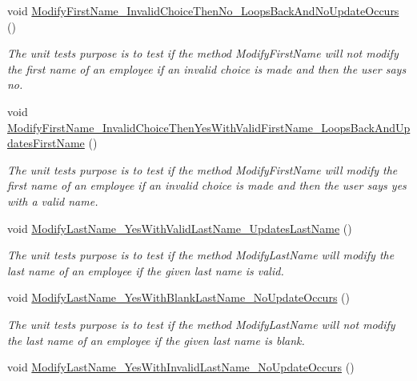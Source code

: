 \begin{DoxyCompactItemize}
void \hyperlink{class_the_company_1_1_tests_1_1_modify_employee_tests_a727562d5a016f961b0f441e896a9de1a}{Modify\+First\+Name\+\_\+\+Invalid\+Choice\+Then\+No\+\_\+\+Loops\+Back\+And\+No\+Update\+Occurs} ()
\begin{DoxyCompactList}\small\item\em The unit test\textquotesingle{}s purpose is to test if the method Modify\+First\+Name will not modify the first name of an employee if an invalid choice is made and then the user says no. \end{DoxyCompactList}\item 
void \hyperlink{class_the_company_1_1_tests_1_1_modify_employee_tests_ab634694a28fefe065d015224b953fa4b}{Modify\+First\+Name\+\_\+\+Invalid\+Choice\+Then\+Yes\+With\+Valid\+First\+Name\+\_\+\+Loops\+Back\+And\+Updates\+First\+Name} ()
\begin{DoxyCompactList}\small\item\em The unit test\textquotesingle{}s purpose is to test if the method Modify\+First\+Name will modify the first name of an employee if an invalid choice is made and then the user says yes with a valid name. \end{DoxyCompactList}\item 
void \hyperlink{class_the_company_1_1_tests_1_1_modify_employee_tests_a3c1f811c08a8b26a109ac0627672f3f3}{Modify\+Last\+Name\+\_\+\+Yes\+With\+Valid\+Last\+Name\+\_\+\+Updates\+Last\+Name} ()
\begin{DoxyCompactList}\small\item\em The unit test\textquotesingle{}s purpose is to test if the method Modify\+Last\+Name will modify the last name of an employee if the given last name is valid. \end{DoxyCompactList}\item 
void \hyperlink{class_the_company_1_1_tests_1_1_modify_employee_tests_a888d311289db59d07f9543ca03958fca}{Modify\+Last\+Name\+\_\+\+Yes\+With\+Blank\+Last\+Name\+\_\+\+No\+Update\+Occurs} ()
\begin{DoxyCompactList}\small\item\em The unit test\textquotesingle{}s purpose is to test if the method Modify\+Last\+Name will not modify the last name of an employee if the given last name is blank. \end{DoxyCompactList}\item 
void \hyperlink{class_the_company_1_1_tests_1_1_modify_employee_tests_a96ee0bd43e9af40ee74aa323e918d74f}{Modify\+Last\+Name\+\_\+\+Yes\+With\+Invalid\+Last\+Name\+\_\+\+No\+Update\+Occurs} ()

\end{DoxyCompactItemize}
